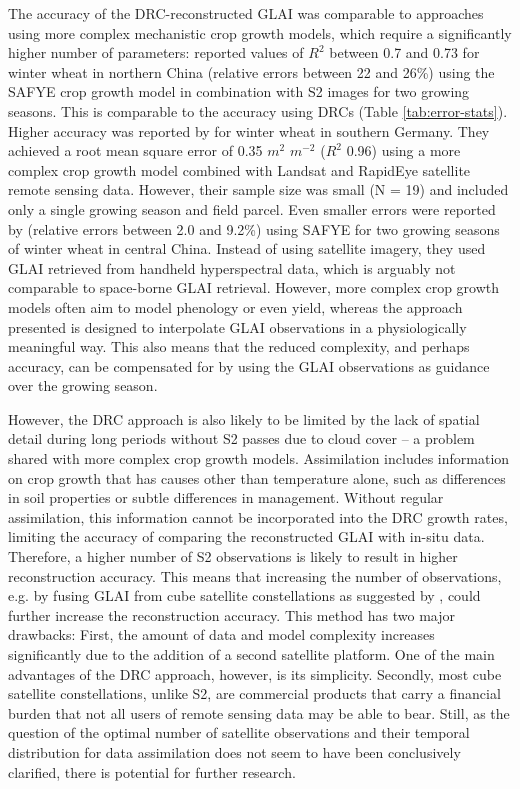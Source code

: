 The accuracy of the \gls{DRC}-reconstructed \gls{GLAI} was comparable to approaches using more complex mechanistic crop growth models, which require a significantly higher number of parameters: \cite{ma_wheat_2022} reported values of $R^2$ between 0.7 and 0.73 for winter wheat in northern China (relative errors between 22 and 26\%) using the \gls{SAFYE} crop growth model in combination with \gls{S2} images for two growing seasons. This is comparable to the accuracy using \gls{DRC}s (Table \ref{tab:error-stats}). Higher accuracy was reported by \cite{hank_using_2015} for winter wheat in southern Germany. They achieved a root mean square error of 0.35 $m^2$ $m^{-2}$ ($R^2$ 0.96) using a more complex crop growth model combined with Landsat and RapidEye satellite remote sensing data. However, their sample size was small (N = 19) and included only a single growing season and field parcel. Even smaller errors were reported by \cite{zhang_improving_2021} (relative errors between 2.0 and 9.2\%) using \gls{SAFYE} for two growing seasons of winter wheat in central China. Instead of using satellite imagery, they used \gls{GLAI} retrieved from handheld hyperspectral data, which is arguably not comparable to space-borne \gls{GLAI} retrieval. However, more complex crop growth models often aim to model phenology or even yield, whereas the approach presented is designed to interpolate \gls{GLAI} observations in a physiologically meaningful way. This also means that the reduced complexity, and perhaps accuracy, can be compensated for by using the \gls{GLAI} observations as guidance over the growing season.

However, the \gls{DRC} approach is also likely to be limited by the lack of spatial detail during long periods without \gls{S2} passes due to cloud cover -- a problem shared with more complex crop growth models. Assimilation includes information on crop growth that has causes other than temperature alone, such as differences in soil properties or subtle differences in management. Without regular assimilation, this information cannot be incorporated into the \gls{DRC} growth rates, limiting the accuracy of comparing the reconstructed \gls{GLAI} with in-situ data. Therefore, a higher number of \gls{S2} observations is likely to result in higher reconstruction accuracy. This means that increasing the number of observations, e.g. by fusing \gls{GLAI} from cube satellite constellations as suggested by \cite{sadeh_fusion_2021}, could further increase the reconstruction accuracy. This method has two major drawbacks: First, the amount of data and model complexity increases significantly due to the addition of a second satellite platform. One of the main advantages of the \gls{DRC} approach, however, is its simplicity. Secondly, most cube satellite constellations, unlike \gls{S2}, are commercial products that carry a financial burden that not all users of remote sensing data may be able to bear. Still, as the question of the optimal number of satellite observations and their temporal distribution for data assimilation does not seem to have been conclusively clarified, there is potential for further research.

